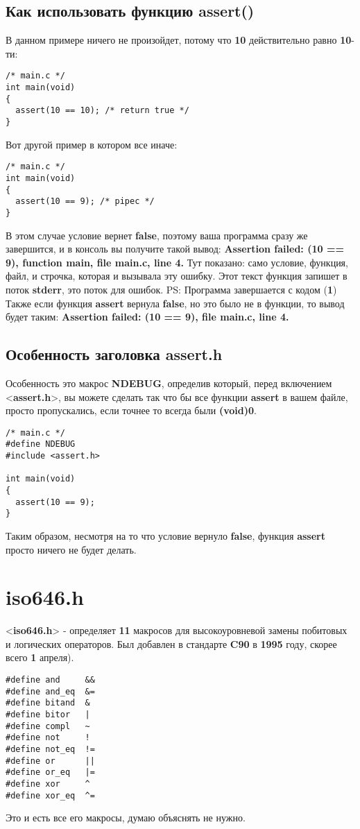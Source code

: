 \documentclass[12pt, letterpaper]{article}
\begin{document}
\subsection{Как использовать функцию assert()}
В данном примере ничего не произойдет, потому что \textbf{10} действительно равно \textbf{10}-ти:
\begin{lstlisting}
/* main.c */
int main(void)
{
  assert(10 == 10); /* return true */
}
\end{lstlisting}
Вот другой пример в котором все иначе:
\begin{lstlisting}
/* main.c */
int main(void)
{
  assert(10 == 9); /* pipec */
}
\end{lstlisting}
В этом случае условие вернет \textbf{false}, поэтому ваша программа сразу же завершится, и в консоль вы получите такой вывод:
\newline
\newline
\textbf{Assertion failed: (10 == 9), function main, file main.c, line 4.}
\newline
\newline
Тут показано: само условие, функция, файл, и строчка, которая и вызывала эту ошибку.
Этот текст функция запишет в поток \textbf{stderr}, это поток для ошибок.
\newline
\newline
PS: Программа завершается с кодом (\textbf{1})
\newline
\newline
Также если функция \textbf{assert} вернула \textbf{false}, но это было не в функции, то вывод будет таким:
\textbf{Assertion failed: (10 == 9), file main.c, line 4.}
\subsection{Особенность заголовка assert.h}
Особенность это макрос \textbf{NDEBUG}, определив который, перед включением <\textbf{assert.h}>, вы можете сделать так что бы
все функции \textbf{assert} в вашем файле, просто пропускались, если точнее то всегда были \textbf{(void)0}.
\begin{lstlisting}
/* main.c */
#define NDEBUG
#include <assert.h>

int main(void)
{
  assert(10 == 9);
}
\end{lstlisting}
Таким образом, несмотря на то что условие вернуло \textbf{false}, функция \textbf{assert} просто ничего не будет делать.

\section{iso646.h}
<\textbf{iso646.h}> - определяет \textbf{11} макросов для высокоуровневой замены побитовых и логических операторов.
Был добавлен в стандарте \textbf{C90} в \textbf{1995} году, скорее всего \textbf{1} апреля).
\begin{lstlisting}
#define and     &&
#define and_eq  &=
#define bitand  &
#define bitor   |
#define compl   ~
#define not     !
#define not_eq  !=
#define or      ||
#define or_eq   |=
#define xor     ^
#define xor_eq  ^=
\end{lstlisting}
Это и есть все его макросы, думаю объяснять не нужно.
\end{document}
